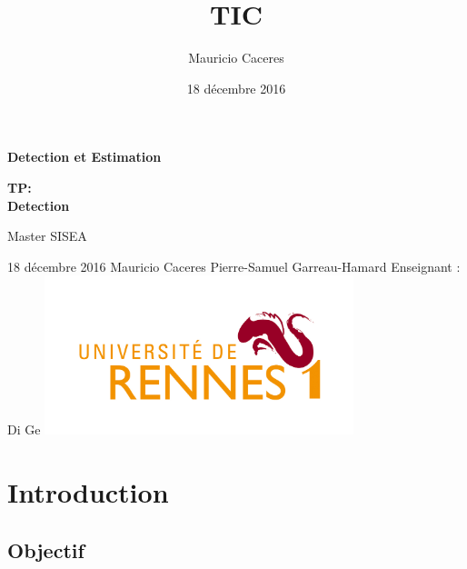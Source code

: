 \documentclass{report}
\title{TIC}
\author{Mauricio Caceres}
\date{18 décembre 2016}
\begin{document}
\begin{titlepage}
	\centering
	\vfill
{\bfseries\huge Detection et Estimation}
	\vfill
	{\bfseries\LARGE
		TP:\\
		Detection
		\\
		\vskip2cm

		Master SISEA\\
	
	}
	\vfill
	18 décembre 2016
	\vfill
	{\large Mauricio Caceres } \hfill  {\large Pierre-Samuel Garreau-Hamard}
	\vfill
	{\large Enseignant : Di Ge }
	\vfill
	\includegraphics[width=9cm]{rennes} %
	\vfill
	\vfill
\end{titlepage}





\chapter{Introduction}
\section{Objectif}
\end{document}
